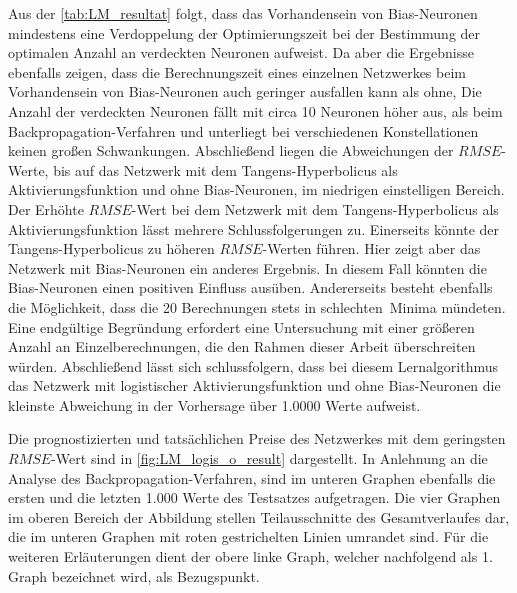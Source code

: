 Aus der \autoref{tab:LM_resultat} folgt, dass das Vorhandensein von Bias-Neuronen mindestens eine Verdoppelung der Optimierungszeit bei der Bestimmung der optimalen Anzahl an verdeckten Neuronen aufweist. Da aber die Ergebnisse ebenfalls zeigen, dass die Berechnungszeit eines einzelnen Netzwerkes beim Vorhandensein von Bias-Neuronen auch geringer ausfallen kann als ohne,  Die Anzahl der verdeckten Neuronen fällt mit circa 10 Neuronen höher aus, als beim Backpropagation-Verfahren und unterliegt bei verschiedenen Konstellationen keinen großen Schwankungen. Abschließend liegen die Abweichungen der $RMSE$-Werte, bis auf das Netzwerk mit dem Tangens-Hyperbolicus als Aktivierungsfunktion und ohne Bias-Neuronen, im niedrigen einstelligen Bereich. Der Erhöhte $RMSE$-Wert bei dem Netzwerk mit dem Tangens-Hyperbolicus als Aktivierungsfunktion lässt mehrere Schlussfolgerungen zu. Einerseits könnte der Tangens-Hyperbolicus zu höheren $RMSE$-Werten führen. Hier zeigt aber das Netzwerk mit Bias-Neuronen ein anderes Ergebnis. In diesem Fall könnten die Bias-Neuronen einen positiven Einfluss ausüben. Andererseits besteht ebenfalls die Möglichkeit, dass die 20 Berechnungen stets in \glqq schlechten\grqq~Minima mündeten. Eine endgültige Begründung erfordert eine Untersuchung mit einer größeren Anzahl an Einzelberechnungen, die den Rahmen dieser Arbeit überschreiten würden. Abschließend lässt sich schlussfolgern, dass bei diesem Lernalgorithmus das Netzwerk mit logistischer Aktivierungsfunktion und ohne Bias-Neuronen die kleinste Abweichung in der Vorhersage über 1.0000 Werte aufweist.

Die prognostizierten und tatsächlichen Preise des Netzwerkes mit dem geringsten $RMSE$-Wert sind in \autoref{fig:LM_logis_o_result} dargestellt. In Anlehnung an die Analyse des Backpropagation-Verfahren, sind im unteren Graphen ebenfalls die ersten und die letzten 1.000 Werte des Testsatzes aufgetragen. Die vier Graphen im oberen Bereich der Abbildung stellen Teilausschnitte des Gesamtverlaufes dar, die im unteren Graphen mit roten gestrichelten Linien umrandet sind. Für die weiteren Erläuterungen dient der obere linke Graph, welcher nachfolgend als 1. Graph bezeichnet wird, als Bezugspunkt.

\begin{figure}[!htb]
    \centering
        
    \caption{}
    \label{fig:LM_logis_o_result}
\end{figure}

